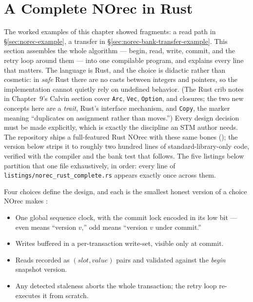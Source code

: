 \section{A Complete NOrec in Rust}
\label{sec:norec-rust-complete}

The worked examples of this chapter showed fragments: a read path in
\S\ref{sec:norec-example}, a transfer in
\S\ref{sec:norec-bank-transfer-example}. This section assembles the whole
algorithm --- begin, read, write, commit, and the retry loop around them ---
into one compilable program, and explains every line that matters. The
language is Rust, and the choice is didactic rather than cosmetic: in
\emph{safe} Rust there are no casts between integers and pointers, so the
implementation cannot quietly rely on undefined behavior. (The Rust crib
notes in Chapter~9's Calvin section cover \texttt{Arc}, \texttt{Vec},
\texttt{Option}, and closures; the two new concepts here are a \emph{trait},
Rust's interface mechanism, and \texttt{Copy}, the marker meaning
``duplicates on assignment rather than moves.'') Every design
decision must be made explicitly, which is exactly the discipline an STM
author needs. The repository ships a full-featured Rust NOrec with these
same bones (); the version
below strips it to roughly two hundred lines of standard-library-only code,
verified with the compiler and the bank test that follows. The five listings
below partition that one file exhaustively, in order: every line of
\texttt{listings/norec\_rust\_complete.rs} appears exactly once across them.

Four choices define the design, and each is the smallest honest version of
a choice NOrec makes \cite{dalessandro10norec}:

\begin{itemize}
    \item One global sequence clock, with the commit lock encoded in its
          low bit --- even means ``version $v$,'' odd means ``version $v$
          under commit.''
    \item Writes buffered in a per-transaction write-set, visible only at
          commit.
    \item Reads recorded as $(slot, value)$ pairs and validated against
          the \emph{begin} snapshot version.
    \item Any detected staleness aborts the whole transaction; the retry
          loop re-executes it from scratch.
\end{itemize}

